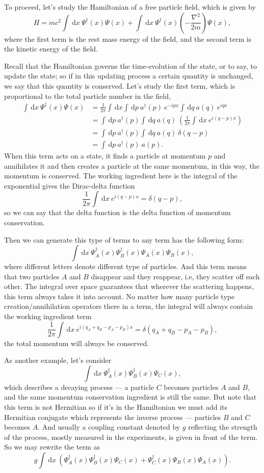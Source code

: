 \documentclass{article}
\newcommand{\be}{\begin{equation}}
\newcommand{\ee}{\end{equation}}
\newcommand{\dif}{\,\mathrm{d}}
\renewcommand{\1}{\left}
\renewcommand{\2}{\right}
\newcommand{\del}{\delta}
\begin{document}
To proceed, let's study the Hamiltonian of a free particle field, which is given by
\be
H=mc^2\int\dif x\ \Psi^\dag(x)\Psi(x)+\int\dif x\ \Psi^\dag(x)  \1(-\frac{\nabla^2}{2m}\2)\Psi(x),
\ee
where the first term is the rest mass energy of the field, and the second term is the kinetic energy of the field. 

Recall that the Hamiltonian governs the time-evolution of the state, or to say, to update the state; so if in this updating process a certain quantity is unchanged, we say that this quantity is conserved. Let's study the first term, which is proportional to the total particle number in the field,
\be\begin{split}
\int\dif x\ \Psi^\dag(x)\Psi(x)&=\frac 1 {2\pi}\int\dif x\int\dif p\ a^\dag(p) \ e^{-ipx} \int\dif q\ a(q)\ e^{iqx}\\
&=\int\dif p\ a^\dag(p)\int\dif q\ a(q)\ \1(\frac 1 {2\pi}\int\dif x\ e^{i(q-p)x}\2)\\
&=\int\dif p\ a^\dag(p)\int\dif q\ a(q)\ \del(q-p)\\
&=\int\dif p\ a^\dag(p)\ a(p).
\end{split}\ee
When this term acts on a state, it finds a particle at momentum $p$ and annihilates it and then creates a particle at the same momentum, in this way, the momentum is conserved. The working ingredient here is the integral of the exponential gives the Dirac-delta function
\be
\frac 1 {2\pi} \int\dif x\ e^{i(q-p)x}=\del(q-p),
\ee
so we can say that the delta function is the delta function of momentum conservation.

Then we can generate this type of terms to any term has the following form:
\be
\int\dif x\ \Psi_A^\dag(x)\Psi_B^\dag(x)\Psi_A(x)\Psi_B(x),
\ee
where different letters denote different type of particles. And this term means that two particles $A$ and $B$ disappear and they reappear, i.e, they scatter off each other. The integral over space guarantees that wherever the scattering happens, this term always takes it into account. No matter how many particle type creation/annihilation operators there in a term, the integral will always contain the working ingredient term
\be
\frac 1 {2\pi} \int\dif x\ e^{i(q_A+q_B-p_A-p_B)x}=\del(q_A+q_B-p_A-p_B),
\ee
the total momentum will always be conserved.

As another example, let's consider
\be
\int\dif x\ \Psi_A^\dag(x)\Psi_B^\dag(x)\Psi_C(x),
\ee
which describes a decaying process --- a particle $C$ becomes particles $A$ and $B$, and the same momentum conservation ingredient is still the same. But note that this term is not Hermitian so if it's in the Hamiltonian we must add its Hermitian conjugate which represents the inverse process --- particles $B$ and $C$ becomes $A$. And usually a coupling constant denoted by $g$ reflecting the strength of the process, mostly measured in the experiments, is given in front of the term. So we may rewrite the term as
\be
g\int\dif x\ \1(\Psi_A^\dag(x)\Psi_B^\dag(x)\Psi_C(x)+\Psi_C^\dag(x)\Psi_B(x)\Psi_A(x)\2).
\ee
\end{document}
